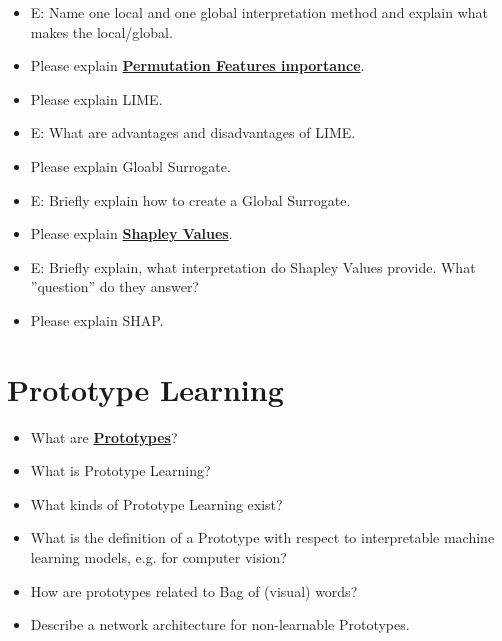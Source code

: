 \documentclass{report}
\newcommand{\asw}[2][teal]{}
\renewcommand{\asw}[2][teal]{\textcolor{#1}{#2}}
\begin{document}
	\begin{itemize}
	\item E: Name one local and one global interpretation method and explain what makes the local/global.
	\asw{\newline }
	
	\item Please explain \textbf{\underline{Permutation Features importance}}.
	\asw{\newline }
	\item Please explain LIME.
	\asw{\newline }
	\item E: What are advantages and disadvantages of LIME.
	\asw{\newline }
	\item Please explain Gloabl Surrogate.
	\asw{\newline }
	\item E: Briefly explain how to create a Global Surrogate.
	\asw{\newline }
	
	\item Please explain \textbf{\underline{Shapley Values}}.
	\asw{\newline }
	\item E: Briefly explain, what interpretation do Shapley Values provide. What ”question” do they answer?
	\asw{\newline }
	\item Please explain SHAP.
	\asw{\newline }
	
	\end{itemize}
	
	\section{Prototype Learning}
	
	\begin{itemize}
	\item What are \textbf{\underline{Prototypes}}?
	\asw{\newline }
	\item What is Prototype Learning?
	\asw{\newline }
	\item What kinds of Prototype Learning exist?
	\asw{\newline }
	\item What is the definition of a Prototype with respect to interpretable machine learning models, e.g. for computer vision?
	\asw{\newline }
	\item How are prototypes related to Bag of (visual) words?
	\asw{\newline }
	\item Describe a network architecture for non-learnable Prototypes.
	\asw{\newline }
	\end{itemize}
	
\end{document}
